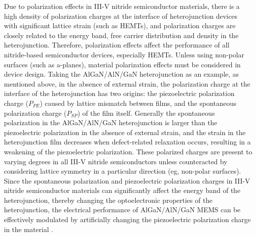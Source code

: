Due to polarization effects in III-V nitride  semiconductor materials, there is a high density of polarization charges  at the interface  of heterojunction devices with significant lattice strain  (such as HEMTs), and polarization charges  are closely related to the energy  band, free carrier distribution  and density in the heterojunction. Therefore, polarization effects  affect the performance of all nitride-based semiconductor devices, especially  HEMTs. Unless using non-polar surfaces  (such as a-planes), material polarization effects must be considered in device design. Taking the AlGaN/AlN/GaN  heterojunction as an example, as mentioned above, in the absence of external  strain, the polarization charge at the interface  of the heterojunction has two origins: the piezoelectric polarization  charge ($P_{PE}$) caused by lattice mismatch  between films, and the spontaneous polarization  charge ($P_{SP}$) of the film itself. Generally the spontaneous polarization in the AlGaN/AlN/GaN heterojunction is larger than the piezoelectric polarization in the absence of external strain, and the strain in the heterojunction film decreases when defect-related relaxation occurs, resulting in a weakening of the  piezoelectric polarization. These polarized charges are present to varying degrees in all III-V nitride  semiconductors unless counteracted by considering lattice symmetry in a particular direction (eg, non-polar surfaces). Since the spontaneous polarization and piezoelectric polarization charges in III-V nitride semiconductor materials can significantly affect the energy band  of the heterojunction, thereby changing the optoelectronic properties of the heterojunction, the electrical performance of AlGaN/AlN/GaN  MEMS  can be effectively modulated by artificially changing the piezoelectric polarization charge in the material \cite{kim2013polarization,jena2011polarization,verma2018polarization}.

